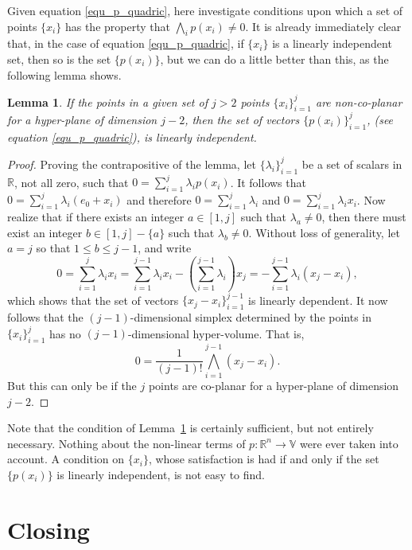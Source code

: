 \documentclass{birkjour}
\newtheorem{lem}[thm]{Lemma}
\theoremstyle{definition}
\theoremstyle{remark}
\numberwithin{equation}{section}
\newcommand{\R}{\mathbb{R}}
\newcommand{\V}{\mathbb{V}}
\begin{document}
Given equation \eqref{equ_p_quadric}, here investigate conditions upon
which a set of points $\{x_i\}$ has the property that $\bigwedge_i p(x_i)\neq 0$.
It is already immediately clear that, in the case of equation \eqref{equ_p_quadric},
if $\{x_i\}$ is a linearly independent set, then so is the set $\{p(x_i)\}$, but we
can do a little better than this, as the following lemma shows.
\begin{lem}\label{lma_non_co_planar}
If the points in a given set of $j>2$ points $\{x_i\}_{i=1}^j$ are non-co-planar for a hyper-plane of
dimension $j-2$, then the set of vectors $\{p(x_i)\}_{i=1}^j$, (see equation \eqref{equ_p_quadric}),
is linearly independent.
\end{lem}
\begin{proof}
Proving the contrapositive of the lemma, let $\{\lambda_i\}_{i=1}^j$ be
a set of scalars in $\R$, not all zero, such that $0=\sum_{i=1}^j\lambda_i p(x_i)$.
It follows that $0=\sum_{i=1}^j\lambda_i(e_0+x_i)$ and therefore
$0=\sum_{i=1}^j\lambda_i$ and $0=\sum_{i=1}^j\lambda_i x_i$.
Now realize that if there exists an integer $a\in[1,j]$ such that $\lambda_a\neq 0$,
then there must exist an integer $b\in[1,j]-\{a\}$ such that $\lambda_b\neq 0$.
Without loss of generality, let $a=j$ so that $1\leq b\leq j-1$, and write
\begin{equation*}
0 = \sum_{i=1}^j\lambda_ix_i = \sum_{i=1}^{j-1}\lambda_ix_i - \left(\sum_{i=1}^{j-1}\lambda_i\right)x_j = -\sum_{i=1}^{j-1}\lambda_i(x_j-x_i),
\end{equation*}
which shows that the set of vectors $\{x_j-x_i\}_{i=1}^{j-1}$ is linearly dependent.
It now follows that the $(j-1)$-dimensional simplex determined by the points in $\{x_i\}_{i=1}^j$
has no $(j-1)$-dimensional hyper-volume.  That is,
\begin{equation*}
0 = \frac{1}{(j-1)!}\bigwedge_{i=1}^{j-1}(x_j-x_i).
\end{equation*}
But this can only be if the $j$ points are co-planar for a hyper-plane of dimension $j-2$.
\end{proof}
Note that the condition of Lemma~\ref{lma_non_co_planar} is certainly sufficient, but
not entirely necessary.  Nothing about the non-linear terms of $p:\R^n\to\V$ were ever
taken into account.  A condition on $\{x_i\}$, whose satisfaction is had if and only if the
set $\{p(x_i)\}$ is linearly independent, is not easy to find.

\section{Closing}
\end{document}
